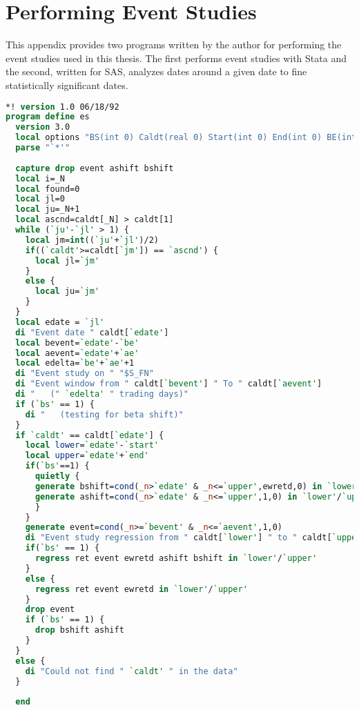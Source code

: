 \appendix
\chapter{Performing Event Studies}

This appendix provides two programs written by the author for performing the event studies used in this thesis.  The first performs event studies with Stata and the second, written for SAS, analyzes dates around a given date to fine statistically significant dates.

\begin{singlespace}
\begin{lstlisting}[language=stata,caption=Event studies with Stata]
*! version 1.0 06/18/92
program define es
  version 3.0
  local options "BS(int 0) Caldt(real 0) Start(int 0) End(int 0) BE(int 0) AE(int 0)"
  parse "`*'"
  
  capture drop event ashift bshift
  local i=_N
  local found=0
  local jl=0
  local ju=_N+1
  local ascnd=caldt[_N] > caldt[1]
  while (`ju'-`jl' > 1) {
    local jm=int((`ju'+`jl')/2)
    if((`caldt'>=caldt[`jm']) == `ascnd') {
      local jl=`jm'
    }
    else {
      local ju=`jm'
    }
  }
  local edate = `jl'
  di "Event date " caldt[`edate']
  local bevent=`edate'-`be'
  local aevent=`edate'+`ae'
  local edelta=`be'+`ae'+1
  di "Event study on " "$S_FN"
  di "Event window from " caldt[`bevent'] " To " caldt[`aevent']
  di "   (" `edelta' " trading days)"
  if (`bs' == 1) {
    di "   (testing for beta shift)"
  }
  if `caldt' == caldt[`edate'] {
    local lower=`edate'-`start'
    local upper=`edate'+`end'
    if(`bs'==1) {
      quietly {
      generate bshift=cond(_n>`edate' & _n<=`upper',ewretd,0) in `lower'/`upper'
      generate ashift=cond(_n>`edate' & _n<=`upper',1,0) in `lower'/`upper'
      }
    }
    generate event=cond(_n>=`bevent' & _n<=`aevent',1,0)
    di "Event study regression from " caldt[`lower'] " to " caldt[`upper']
    if(`bs' == 1) {
      regress ret event ewretd ashift bshift in `lower'/`upper'
    }
    else {
      regress ret event ewretd in `lower'/`upper'
    }
    drop event
    if (`bs' == 1) {
      drop bshift ashift
    }
  }
  else {
    di "Could not find " `caldt' " in the data"
  }
     
  end
\end{lstlisting}
\end{singlespace}

